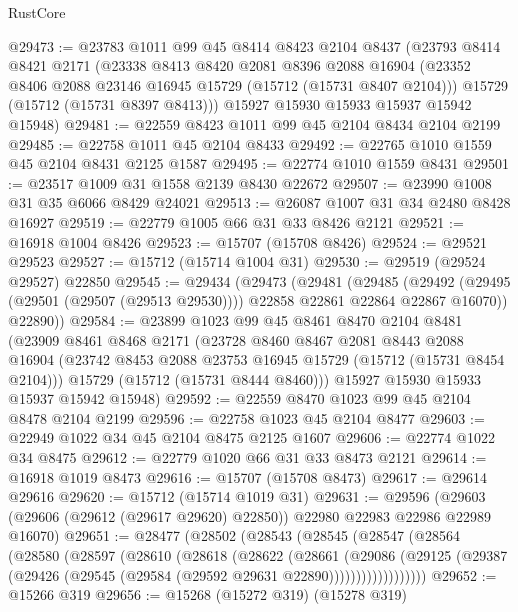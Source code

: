 \begin{lexlean}{RustCore}
\begin{coremodule}
@29473 := @23783
    @1011
    @99
    @45
    @8414
    @8423
    @2104
    @8437
    (@23793
      @8414
      @8421
      @2171
      (@23338
        @8413
        @8420
        @2081
        @8396
        @2088
        @16904
        (@23352 @8406 @2088 @23146 @16945 @15729 (@15712 (@15731 @8407 @2104)))
        @15729
        (@15712 (@15731 @8397 @8413)))
      @15927
      @15930
      @15933
      @15937
      @15942
      @15948)
@29481 := @22559 @8423 @1011 @99 @45 @2104 @8434 @2104 @2199
@29485 := @22758 @1011 @45 @2104 @8433
@29492 := @22765 @1010 @1559 @45 @2104 @8431 @2125 @1587
@29495 := @22774 @1010 @1559 @8431
@29501 := @23517 @1009 @31 @1558 @2139 @8430 @22672
@29507 := @23990 @1008 @31 @35 @6066 @8429 @24021
@29513 := @26087 @1007 @31 @34 @2480 @8428 @16927
@29519 := @22779 @1005 @66 @31 @33 @8426 @2121
@29521 := @16918 @1004 @8426
@29523 := @15707 (@15708 @8426)
@29524 := @29521 @29523
@29527 := @15712 (@15714 @1004 @31)
@29530 := @29519 (@29524 @29527) @22850
@29545 := @29434
    (@29473
      (@29481
        (@29485
          (@29492 (@29495 (@29501 (@29507 (@29513 @29530)))) @22858 @22861 @22864 @22867 @16070))
        @22890))
@29584 := @23899
    @1023
    @99
    @45
    @8461
    @8470
    @2104
    @8481
    (@23909
      @8461
      @8468
      @2171
      (@23728
        @8460
        @8467
        @2081
        @8443
        @2088
        @16904
        (@23742 @8453 @2088 @23753 @16945 @15729 (@15712 (@15731 @8454 @2104)))
        @15729
        (@15712 (@15731 @8444 @8460)))
      @15927
      @15930
      @15933
      @15937
      @15942
      @15948)
@29592 := @22559 @8470 @1023 @99 @45 @2104 @8478 @2104 @2199
@29596 := @22758 @1023 @45 @2104 @8477
@29603 := @22949 @1022 @34 @45 @2104 @8475 @2125 @1607
@29606 := @22774 @1022 @34 @8475
@29612 := @22779 @1020 @66 @31 @33 @8473 @2121
@29614 := @16918 @1019 @8473
@29616 := @15707 (@15708 @8473)
@29617 := @29614 @29616
@29620 := @15712 (@15714 @1019 @31)
@29631 := @29596
    (@29603 (@29606 (@29612 (@29617 @29620) @22850)) @22980 @22983 @22986 @22989 @16070)
@29651 := @28477
    (@28502
      (@28543
        (@28545
          (@28547
            (@28564
              (@28580
                (@28597
                  (@28610
                    (@28618
                      (@28622
                        (@28661
                          (@29086
                            (@29125
                              (@29387
                                (@29426 (@29545 (@29584 (@29592 @29631 @22890))))))))))))))))))
@29652 := @15266 @319
@29656 := @15268 (@15272 @319) (@15278 @319)

\end{coremodule}
\end{lexlean}
